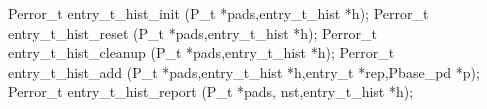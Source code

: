 \begin{code}
Perror\_t entry\_t\_hist\_init (P\_t *pads,entry\_t\_hist *h);
Perror\_t entry\_t\_hist\_reset (P\_t *pads,entry\_t\_hist *h);
Perror\_t entry\_t\_hist\_cleanup (P\_t *pads,entry\_t\_hist *h);
Perror\_t entry\_t\_hist\_add (P\_t *pads,entry\_t\_hist *h,entry\_t
*rep,Pbase\_pd *p);
Perror\_t entry\_t\_hist\_report (P\_t *pads, nst,entry\_t\_hist *h);
\end{code}
